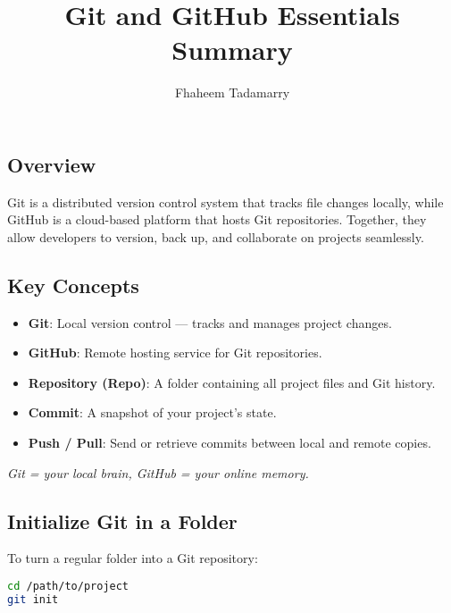 \documentclass[11pt,letterpaper]{article}
\title{\textbf{Git and GitHub Essentials Summary}}
\author{Fhaheem Tadamarry}
\date{}
\begin{document}
\maketitle
\tableofcontents
\newpage


\subsection{Overview}
Git is a distributed version control system that tracks file changes locally, while GitHub is a cloud-based platform that hosts Git repositories. Together, they allow developers to version, back up, and collaborate on projects seamlessly.

\subsection{Key Concepts}
\begin{itemize}
    \item \textbf{Git}: Local version control — tracks and manages project changes.
    \item \textbf{GitHub}: Remote hosting service for Git repositories.
    \item \textbf{Repository (Repo)}: A folder containing all project files and Git history.
    \item \textbf{Commit}: A snapshot of your project’s state.
    \item \textbf{Push / Pull}: Send or retrieve commits between local and remote copies.
\end{itemize}

\begin{quotebox}
\textit{Git = your local brain, GitHub = your online memory.}
\end{quotebox}


\subsection{Initialize Git in a Folder}
To turn a regular folder into a Git repository:
\begin{lstlisting}[language=bash]
cd /path/to/project
git init
\end{lstlisting}
\end{document}
